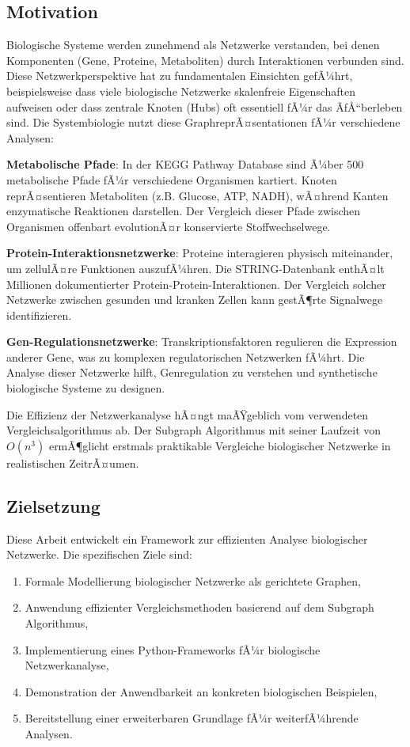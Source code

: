 ﻿\documentclass[a4paper,12pt]{article}
\theoremstyle{definition}
\begin{document}
\subsection{Motivation}

Biologische Systeme werden zunehmend als Netzwerke verstanden, bei denen Komponenten (Gene, Proteine, Metaboliten) durch Interaktionen verbunden sind. Diese Netzwerkperspektive hat zu fundamentalen Einsichten gefÃ¼hrt, beispielsweise dass viele biologische Netzwerke skalenfreie Eigenschaften aufweisen oder dass zentrale Knoten (Hubs) oft essentiell fÃ¼r das ÃƒÅ“berleben sind. Die Systembiologie nutzt diese GraphreprÃ¤sentationen fÃ¼r verschiedene Analysen:

\textbf{Metabolische Pfade}: In der KEGG Pathway Database sind Ã¼ber 500 metabolische Pfade fÃ¼r verschiedene Organismen kartiert. Knoten reprÃ¤sentieren Metaboliten (z.B. Glucose, ATP, NADH), wÃ¤hrend Kanten enzymatische Reaktionen darstellen. Der Vergleich dieser Pfade zwischen Organismen offenbart evolutionÃ¤r konservierte Stoffwechselwege.

\textbf{Protein-Interaktionsnetzwerke}: Proteine interagieren physisch miteinander, um zellulÃ¤re Funktionen auszufÃ¼hren. Die STRING-Datenbank enthÃ¤lt Millionen dokumentierter Protein-Protein-Interaktionen. Der Vergleich solcher Netzwerke zwischen gesunden und kranken Zellen kann gestÃ¶rte Signalwege identifizieren.

\textbf{Gen-Regulationsnetzwerke}: Transkriptionsfaktoren regulieren die Expression anderer Gene, was zu komplexen regulatorischen Netzwerken fÃ¼hrt. Die Analyse dieser Netzwerke hilft, Genregulation zu verstehen und synthetische biologische Systeme zu designen.

Die Effizienz der Netzwerkanalyse hÃ¤ngt maÃŸgeblich vom verwendeten Vergleichsalgorithmus ab. Der Subgraph Algorithmus mit seiner Laufzeit von $O(n^3)$ ermÃ¶glicht erstmals praktikable Vergleiche biologischer Netzwerke in realistischen ZeitrÃ¤umen.

\subsection{Zielsetzung}

Diese Arbeit entwickelt ein Framework zur effizienten Analyse biologischer Netzwerke. Die spezifischen Ziele sind:

\begin{enumerate}
	\item Formale Modellierung biologischer Netzwerke als gerichtete Graphen,
	\item Anwendung effizienter Vergleichsmethoden basierend auf dem Subgraph Algorithmus,
	\item Implementierung eines Python-Frameworks fÃ¼r biologische Netzwerkanalyse,
	\item Demonstration der Anwendbarkeit an konkreten biologischen Beispielen,
	\item Bereitstellung einer erweiterbaren Grundlage fÃ¼r weiterfÃ¼hrende Analysen.
\end{enumerate}
\end{document}
